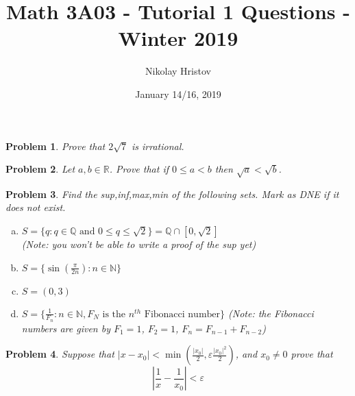 \documentclass[11pt]{article}
\theoremstyle{plain}
\newtheorem{problem}{Problem}
\theoremstyle{remark}
\newcommand {\mbR} {\mathbb R}
\begin{document}
	\title{Math 3A03 - Tutorial 1 Questions - Winter 2019}
	\author{Nikolay Hristov}
	\date{January 14/16, 2019}
	\maketitle
	\begin{problem}
		Prove that $2\sqrt 7$ is irrational.
	\end{problem}
	
	\begin{problem}
		Let $a,b\in\mbR$. Prove that if $0\leq a < b$ then $\sqrt a < \sqrt b$.
	\end{problem}
	
	\begin{problem}
		Find the sup,inf,max,min of the following sets. Mark as DNE if it does not exist.
		
		\begin{enumerate}[(a)]
			\item $S=\{q:q\in\mathbb Q \text{ and }0\leq q \leq \sqrt 2 \}=\mathbb Q \cap [0,\sqrt 2]$\\(Note: you won't be able to write a proof of the sup yet)
			
			\item $S=\{\sin\left( \frac{\pi}{2n} \right) : n\in \mathbb N\}$
			
			\item $S=(0,3)$
			
			\item $S=\{\frac{1}{F_n}: n\in \mathbb N, F_N \text{ is the $n^{th}$ Fibonacci number}\}$ (Note: the Fibonacci numbers are given by $F_1=1$, $F_2=1$, $F_n=F_{n-1}+F_{n-2}$)
			
		\end{enumerate}
	\end{problem}

	\begin{problem}
		Suppose that $|x-x_0|<\min{\left(\frac{|x_0|}{2},\varepsilon \frac{|x_0|^2}{2}\right)}$, and $x_0 \neq 0$ prove that \[\left|\frac 1 x - \frac 1 {x_0}\right|<\varepsilon\]
	\end{problem}
\end{document}
